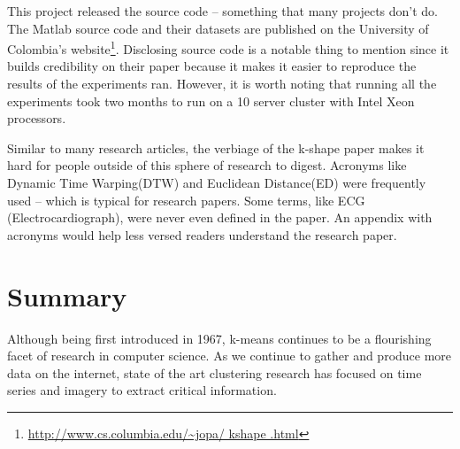 \documentclass[12pt]{apa6}
\begin{document}
This project released the source code -- something that many projects don't do. The Matlab source code and their datasets are published on the University of Colombia's website\footnote{\url{http://www.cs.columbia.edu/~jopa/
kshape
.html}}. Disclosing source code is a notable thing to mention since it builds credibility on their paper because it makes it easier to reproduce the results of the experiments ran. However, it is worth noting that running all the experiments took two months to run on a 10 server cluster with Intel Xeon processors.

Similar to many research articles, the verbiage of the k-shape paper makes it hard for people outside of this sphere of research to digest. Acronyms like Dynamic Time Warping(DTW) and Euclidean Distance(ED) were frequently used -- which is typical for research papers. Some terms, like ECG (Electrocardiograph), were never even defined in the paper. An appendix with acronyms would help less versed readers understand the research paper.  



\section{Summary}


Although being first introduced in 1967, k-means continues to be a flourishing facet of research in computer science. As we continue to gather and produce more data on the internet, state of the art clustering research has focused on time series and imagery to extract critical information\cite{state-of-art}. 




\end{document}
